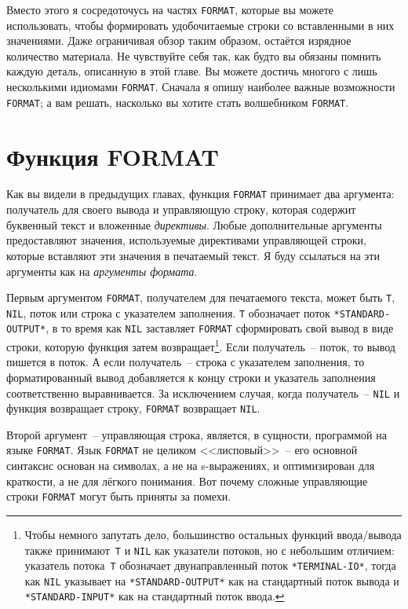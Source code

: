 Вместо этого я сосредоточусь на частях \lstinline{FORMAT}, которые вы можете использовать,
чтобы формировать удобочитаемые строки со вставленными в них значениями. Даже ограничивая
обзор таким образом, остаётся изрядное количество материала. Не чувствуйте себя так, как
будто вы обязаны помнить каждую деталь, описанную в этой главе. Вы можете достичь многого
с лишь несколькими идиомами \lstinline{FORMAT}. Сначала я опишу наиболее важные возможности
\lstinline{FORMAT}; а вам решать, насколько вы хотите стать волшебником \lstinline{FORMAT}.
 
\section{Функция FORMAT}

Как вы видели в предыдущих главах, функция \lstinline{FORMAT} принимает два аргумента:
получатель для своего вывода и управляющую строку, которая содержит буквенный текст и
вложенные \textit{директивы}. Любые дополнительные аргументы предоставляют значения,
используемые директивами управляющей строки, которые вставляют эти значения в печатаемый
текст. Я буду ссылаться на эти аргументы как на \textit{аргументы формата}.

Первым аргументом \lstinline{FORMAT}, получателем для печатаемого текста, может быть
\lstinline{T}, \lstinline{NIL}, поток или строка с указателем заполнения. \lstinline{Т}
обозначает поток \lstinline{*STANDARD-OUTPUT*}, в то время как \lstinline{NIL} заставляет
\lstinline{FORMAT} сформировать свой вывод в виде строки, которую функция затем
возвращает\footnote{Чтобы немного запутать дело, большинство остальных функций
  ввода/вывода также принимают~\lstinline{T} и \lstinline{NIL} как указатели потоков, но с
  небольшим отличием: указатель потока~\lstinline{Т} обозначает двунаправленный поток
  \lstinline{*TERMINAL-IO*}, тогда как \lstinline{NIL} указывает на
  \lstinline{*STANDARD-OUTPUT*} как на стандартный поток вывода и
  \lstinline{*STANDARD-INPUT*} как на стандартный поток ввода.}\hspace{\footnotenegspace}.  Если получатель~--
поток, то вывод пишется в поток. А если получатель~-- строка с указателем заполнения, то
форматированный вывод добавляется к концу строки и указатель заполнения соответственно
выравнивается. За исключением случая, когда получатель~-- \lstinline{NIL} и функция
возвращает строку, \lstinline{FORMAT} возвращает \lstinline{NIL}.

Второй аргумент~-- управляющая строка, является, в сущности, программой на языке
\lstinline{FORMAT}. Язык \lstinline{FORMAT} не целиком <<лисповый>>~-- его основной синтаксис основан
на символах, а не на s-выражениях, и оптимизирован для краткости, а не для лёгкого
понимания. Вот почему сложные управляющие строки \lstinline{FORMAT} могут быть приняты за
помехи.

